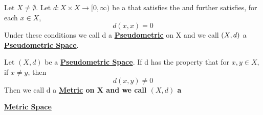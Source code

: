 \label{def:pseudometric}
\newcommand{\Pseudometric}[0]{\textbf{\hyperref[def:pseudometric]{Pseudometric}}\xspace}
\newcommand{\PseudometricSpace}[0]{\textbf{\hyperref[def:pseudometric]{Pseudometric Space}}\xspace}

\begin{df}[Pseudometric]
    Let $X \neq \emptyset$. 
    Let $d:X \times X \to [0,\infty)$ be a \SymmetricMap that satisfies the \TriangleInequality and further satisfies, for each $x \in X$, 
    \begin{equation}
        d(x,x) = 0
    \end{equation}
    Under these conditions we call d a \Pseudometric on X and we call $\left( X,d\right)$ a \PseudometricSpace.
    \end{df} 
	
	
	
\label{def:metric}
\newcommand{\Metric}[0]{
    \bf \hyperref[def:pseudometric]{Metric} \rm
}
\newcommand{\MetricSpace}[0]{
    \bf \hyperref[def:pseudometric]{Metric Space} \rm
}

\begin{df}[Metric]
	Let $(X,d)$ be a \PseudometricSpace. 
	If d has the property that for
	$x,y \in X$, if $x \neq y$, then
	\begin{equation*}
		d(x,y) \neq 0
	\end{equation*}
	Then we call d a \Metric on X 
	and we call $(X,d)$ a
	\MetricSpace
\end{df}
